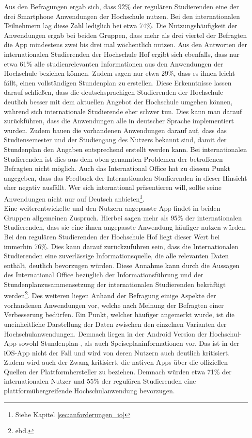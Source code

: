 Aus den Befragungen ergab sich, dass 92\% der regulären Studierenden eine der drei Smartphone Anwendungen der Hochschule nutzen. Bei den internationalen Teilnehmern lag diese Zahl lediglich bei etwa 74\%. Die Nutzungshäufigkeit der Anwendungen ergab bei beiden Gruppen, dass mehr als drei viertel der Befragten die \ac{App} mindestens zwei bis drei mal wöchentlich nutzen. Aus den Antworten der internationalen Studierenden der Hochschule Hof ergibt sich ebenfalls, dass nur etwa 61\% alle studienrelevanten Informationen aus den Anwendungen der Hochschule beziehen können. Zudem sagen nur etwa 29\%, dass es ihnen leicht fällt, einen vollständigen Stundenplan zu erstellen. Diese Erkenntnisse lassen darauf schließen, dass die deutschsprachigen Studierenden der Hochschule deutlich besser mit dem aktuellen Angebot der Hochschule umgehen können, während sich internationale Studierende eher schwer tun.
Dies kann man darauf zurückführen, dass die Anwendungen alle in deutscher Sprache implementiert wurden. Zudem bauen die vorhandenen Anwendungen darauf auf, dass das Studiensemester und der Studiengang des Nutzers bekannt sind, damit der Stundenplan den Angaben entsprechend erstellt werden kann. Bei internationalen Studierenden ist dies aus dem oben genannten Problemen der betroffenen Befragten nicht möglich. Auch das International Office hat zu diesem Punkt angegeben, dass das Feedback der Internationalen Studierenden in dieser Hinsicht eher negativ ausfällt. Wer sich international präsentieren will, sollte seine Anwendungen nicht nur auf Deutsch anbieten\footnote{Siehe Kapitel \ref{sec:anforderungen_io}}.
\\
\linebreak
Eine weiterentwickelte und den Nutzern angepasste \ac{App} findet in beiden Gruppen allgemeinen Zuspruch. Hierbei sagen mehr als 95\% der internationalen Studierenden, dass sie eine ihnen angepasste Anwendung häufiger nutzen würden. Bei den regulären Studierenden der Hochschule Hof liegt dieser Wert bei immerhin 76\%. 
Dies kann darauf zurückzuführen sein, dass die Internationalen Studierenden eine zuverlässige Informationsquelle, die alle relevanten Daten enthält, deutlich bevorzugen würden. Diese Annahme kann durch die Aussagen des International Office bezüglich der Informationsführung und der Stundenplanzusammensetzung der internationalen Studierenden bekräftigt werden\footnote{ebd.}.
Des weiteren liegen Anhand der Befragung einige Aspekte der vorhandenen Anwendungen vor, welche nach Meinung der Befragten einer Verbesserung bedürfen. Ein Punkt, welcher häufiger angemerkt wurde, ist die uneinheitliche Darstellung der Daten zwischen den einzelnen Varianten der Hochschulanwendungen. Demnach liegen in der Android Version der Hochschul-\ac{App} sowohl Stundenplan-, als auch Speiseplaninformationen vor. Das ist in der \ac{iOS}-\ac{App} nicht der Fall und wird von deren Nutzern auch deutlich kritisiert. Zudem wird auch der Zwang kritisiert, die nativen \acp{App} über die offiziellen Quellen der Plattformhersteller zu beziehen. Demnach würden etwa 71\% der internationalen Nutzer und 55\% der regulären Studierenden eine plattformübergreifende Hochschulanwendung bevorzugen. 

